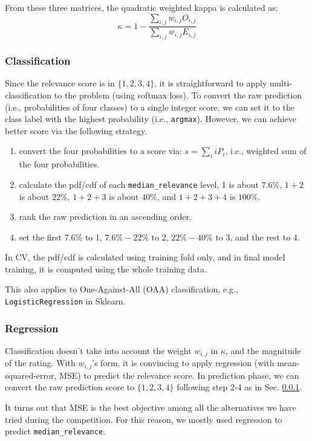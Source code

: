 \documentclass[12pt]{article}
\begin{document}
From these three matrices, the quadratic weighted kappa is calculated as:
\begin{equation}
\kappa = 1 - \frac{\sum_{i,j}w_{i,j}O_{i,j}}{\sum_{i,j}w_{i,j}E_{i,j}}
\end{equation}

\subsubsection{Classification}
\label{subsubsec:Classification}
Since the relevance score is in $\{1,2,3,4\}$, it is straightforward to apply multi-classification to the problem (using softmax loss). To convert the raw prediction (i.e., probabilities of four classes) to a single integer score, we can set it to the class label with the highest probability (i.e., \texttt{argmax}). However, we can achieve better score via the following strategy.
\begin{enumerate}
\item convert the four probabilities to a score via: $s = \sum_{i}iP_i$, i.e., weighted sum of the four probabilities.
\item calculate the pdf/cdf of each \texttt{median\_relevance} level, 1 is about $7.6\%$, $1+2$ is about $22\%$, $1+2+3$ is about $40\%$, and $1+2+3+4$ is $100\%$.
\item rank the raw prediction in an ascending order.
\item set the first $7.6\%$ to 1, $7.6\%-22\%$ to 2, $22\%-40\%$ to 3, and the rest to 4.
\end{enumerate}
In CV, the pdf/cdf is calculated using training fold only, and in final model training, it is computed using the whole training data.

This also applies to One-Against-All (OAA) classification, e.g., \texttt{LogisticRegression} in Sklearn.

\subsubsection{Regression}
Classification doesn't take into account the weight $w_{i,j}$ in $\kappa$, and the magnitude of the rating. With $w_{i,j}$'s form, it is convincing to apply regression (with mean-squared-error, MSE) to predict the relevance score. In prediction phase, we can convert the raw prediction score to $\{1,2,3,4\}$ following step 2-4 as in Sec. \ref{subsubsec:Classification}.

It turns out that MSE is the best objective among all the alternatives we have tried during the competition. For this reason, we mostly used regression to predict \texttt{median\_relevance}.
\end{document}
